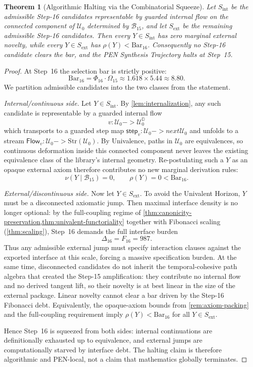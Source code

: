 \documentclass[11pt,a4paper]{article}
\def\to{->}%
\def\bigcirc{next}%
\theoremstyle{plain}
\newtheorem{theorem}{Theorem}[section]
\theoremstyle{definition}
\theoremstyle{remark}
\newcommand{\D}{\mathbb{D}}
\newcommand{\U}{\mathcal{U}}
\begin{document}
\begin{theorem}[Algorithmic Halting via the Combinatorial Squeeze]
\label{thm:end-of-history}
Let $S_{\mathrm{int}}$ be the admissible Step-16 candidates representable by guarded internal flow on the connected component of $\U_0$ determined by $\mathcal{B}_{15}$, and let $S_{\mathrm{ext}}$ be the remaining admissible Step-16 candidates.  Then every $Y \in S_{\mathrm{int}}$ has zero marginal external novelty, while every $Y \in S_{\mathrm{ext}}$ has $\rho(Y) < \mathrm{Bar}_{16}$.  Consequently no Step-16 candidate clears the bar, and the PEN Synthesis Trajectory halts at Step~15.
\end{theorem}
\begin{proof}
At Step~16 the selection bar is strictly positive:
\[
  \mathrm{Bar}_{16} = \Phi_{16} \cdot \Omega_{15} \approx 1.618 \times 5.44 \approx 8.80 .
\]
We partition admissible candidates into the two classes from the statement.

\emph{Internal/continuous side.}
Let $Y \in S_{\mathrm{int}}$.  By \cref{lem:internalization}, any such candidate is representable by a guarded internal flow
\[
  v : \U_0 \to \U_0^\D
\]
which transports to a guarded step map $\mathsf{step}_v : \U_0 \to \bigcirc \U_0$ and unfolds to a stream $\mathsf{Flow}_v : \U_0 \to \mathrm{Str}(\U_0)$.
By Univalence, paths in $\U_0$ are equivalences, so continuous deformation inside this connected component never leaves the existing equivalence class of the library's internal geometry.
Re-postulating such a $Y$ as an opaque external axiom therefore contributes no new marginal derivation rules:
\[
  \nu(Y \mid \mathcal{B}_{15}) = 0,
\qquad
  \rho(Y) = 0 < \mathrm{Bar}_{16}.
\]

\emph{External/discontinuous side.}
Now let $Y \in S_{\mathrm{ext}}$.
To avoid the Univalent Horizon, $Y$ must be a disconnected axiomatic jump.
Then maximal interface density is no longer optional: by the full-coupling regime of \cref{thm:canonicity-preservation,thm:univalent-functoriality} together with Fibonacci scaling (\cref{thm:scaling}), Step~16 demands the full interface burden
\[
  \Delta_{16} = F_{16} = 987 .
\]
Thus any admissible external jump must specify interaction clauses against the exported interface at this scale, forcing a massive specification burden.
At the same time, disconnected candidates do not inherit the temporal-cohesive path algebra that created the Step-15 amplification: they contribute no internal flow and no derived tangent lift, so their novelty is at best linear in the size of the external package.
Linear novelty cannot clear a bar driven by the Step-16 Fibonacci debt.
Equivalently, the opaque-axiom bounds from \cref{rem:axiom-packing} and the full-coupling requirement imply $\rho(Y) < \mathrm{Bar}_{16}$ for all $Y \in S_{\mathrm{ext}}$.

Hence Step~16 is squeezed from both sides: internal continuations are definitionally exhausted up to equivalence, and external jumps are computationally starved by interface debt.
The halting claim is therefore algorithmic and PEN-local, not a claim that mathematics globally terminates.
\end{proof}
\end{document}
